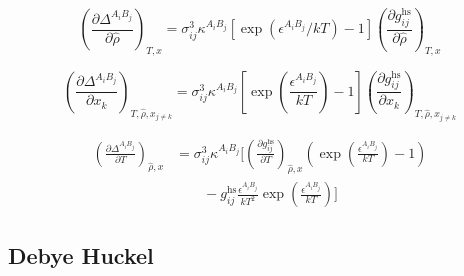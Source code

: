 \documentclass[12pt, letterpaper]{article}
\begin{document}
\begin{equation}
    \left(\frac{\partial\Delta^{A_{i}B_{j}}}{\partial\hat{\rho}}\right)_{T,x}=\sigma_{ij}^3\kappa^{A_{i}B_{j}}\left[\exp(\epsilon^{A_{i}B_{j}}/kT)-1\right]\left(\frac{\partial g_{ij}^{\mathrm{hs}}}{\partial\hat{\rho}}\right)_{T,x}
    \label{eq:ddelta_assoc_drho}
\end{equation}


\begin{equation}
    \left(\frac{\partial \Delta^{A_{i}B_{j}}}{\partial x_{k}}\right)_{T,\hat{\rho},x_{j\neq k}}
    =
    \sigma_{ij}^{3}\kappa^{A_{i}B_{j}}
    \left[\exp\!\left(\frac{\epsilon^{A_{i}B_{j}}}{kT}\right)-1\right]
    \left(\frac{\partial g_{ij}^{\mathrm{hs}}}{\partial x_{k}}\right)_{T,\hat{\rho},x_{j\neq k}}
    \label{eq:ddelta_assoc_dxk}
\end{equation}


\begin{equation}
    \begin{aligned}
        \left(\frac{\partial\Delta^{A_iB_j}}{\partial T}\right)_{\hat{\rho},x}
        &=\sigma_{ij}^{3}\kappa^{A_iB_j}
        \Bigg[
        \left(\frac{\partial g_{ij}^{\mathrm{hs}}}{\partial T}\right)_{\hat{\rho},x}
        \left(\exp\!\left(\frac{\epsilon^{A_iB_j}}{kT}\right)-1\right)
        \\
        &\qquad
        -g_{ij}^{\mathrm{hs}}\frac{\epsilon^{A_iB_j}}{kT^2}
        \exp\!\left(\frac{\epsilon^{A_iB_j}}{kT}\right)
        \Bigg]
    \end{aligned}
    \label{eq:ddelta_assoc_dT}
\end{equation}

\subsection{Debye Huckel}
\label{sec:debye_huckel}
\end{document}
